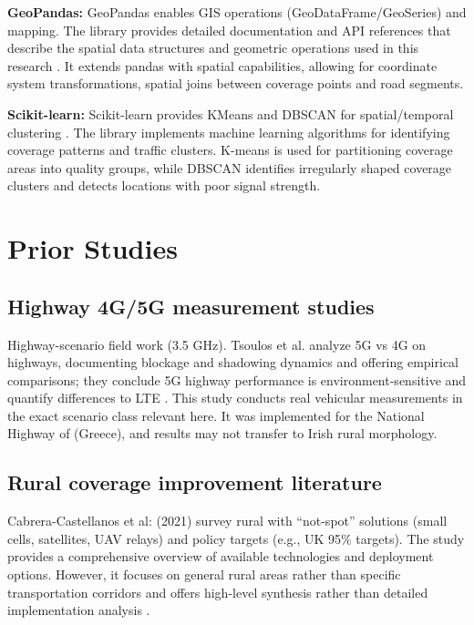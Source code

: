 \documentclass[MScCS]{uccthesis}
\begin{document}
\textbf{GeoPandas:} GeoPandas enables GIS operations (GeoDataFrame/GeoSeries) and mapping. The library provides detailed documentation and API references that describe the spatial data structures and geometric operations used in this research \cite{jordahl2020geopandas}. It extends pandas with spatial capabilities, allowing for coordinate system transformations, spatial joins between coverage points and road segments.

\textbf{Scikit-learn:} Scikit-learn provides KMeans and DBSCAN for spatial/temporal clustering \cite{pedregosa2011scikit}. The library implements machine learning algorithms for identifying coverage patterns and traffic clusters. K-means is used for partitioning coverage areas into quality groups, while DBSCAN identifies irregularly shaped coverage clusters and detects locations with poor signal strength.

\section{Prior Studies}

\subsection{Highway 4G/5G measurement studies}

Highway-scenario field work (3.5 GHz). Tsoulos et al. analyze 5G vs 4G on highways, documenting blockage and shadowing dynamics and offering empirical comparisons; they conclude 5G highway performance is environment-sensitive and quantify differences to LTE \cite{tsoulos2024highway}.
This study conducts real vehicular measurements in the exact scenario class relevant here.
It was implemented for the National Highway of (Greece), and results may not transfer to Irish rural morphology.


\subsection{Rural coverage improvement literature}

Cabrera-Castellanos et al: (2021) survey rural with ``not-spot'' solutions (small cells, satellites, UAV relays) and policy targets (e.g., UK 95\% targets). The study provides a comprehensive overview of available technologies and deployment options. However, it focuses on general rural areas rather than specific transportation corridors and offers high-level synthesis rather than detailed implementation analysis \cite{Cabrera2021}.
\end{document}

